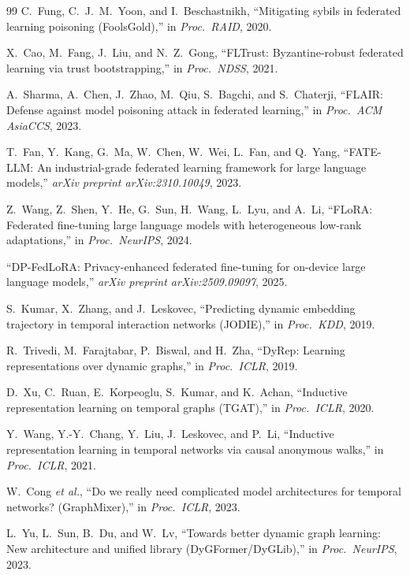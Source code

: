 \documentclass[12pt,a4paper]{article}
\theoremstyle{definition}
\theoremstyle{remark}
\begin{document}
\begin{thebibliography}{99}
C.~Fung, C.~J.~M.~Yoon, and I.~Beschastnikh, ``Mitigating sybils in federated learning poisoning ({FoolsGold}),'' in \emph{Proc.\ RAID}, 2020.

X.~Cao, M.~Fang, J.~Liu, and N.~Z.~Gong, ``{FLTrust}: {Byzantine}-robust federated learning via trust bootstrapping,'' in \emph{Proc.\ NDSS}, 2021.

A.~Sharma, A.~Chen, J.~Zhao, M.~Qiu, S.~Bagchi, and S.~Chaterji, ``{FLAIR}: Defense against model poisoning attack in federated learning,'' in \emph{Proc.\ ACM AsiaCCS}, 2023.

T.~Fan, Y.~Kang, G.~Ma, W.~Chen, W.~Wei, L.~Fan, and Q.~Yang, ``{FATE-LLM}: An industrial-grade federated learning framework for large language models,'' \emph{arXiv preprint arXiv:2310.10049}, 2023.

Z.~Wang, Z.~Shen, Y.~He, G.~Sun, H.~Wang, L.~Lyu, and A.~Li, ``{FLoRA}: Federated fine-tuning large language models with heterogeneous low-rank adaptations,'' in \emph{Proc.\ NeurIPS}, 2024.

``{DP-FedLoRA}: Privacy-enhanced federated fine-tuning for on-device large language models,'' \emph{arXiv preprint arXiv:2509.09097}, 2025.

S.~Kumar, X.~Zhang, and J.~Leskovec, ``Predicting dynamic embedding trajectory in temporal interaction networks ({JODIE}),'' in \emph{Proc.\ KDD}, 2019.

R.~Trivedi, M.~Farajtabar, P.~Biswal, and H.~Zha, ``{DyRep}: Learning representations over dynamic graphs,'' in \emph{Proc.\ ICLR}, 2019.

D.~Xu, C.~Ruan, E.~Korpeoglu, S.~Kumar, and K.~Achan, ``Inductive representation learning on temporal graphs ({TGAT}),'' in \emph{Proc.\ ICLR}, 2020.

Y.~Wang, Y.-Y.~Chang, Y.~Liu, J.~Leskovec, and P.~Li, ``Inductive representation learning in temporal networks via causal anonymous walks,'' in \emph{Proc.\ ICLR}, 2021.

W.~Cong \emph{et al.}, ``Do we really need complicated model architectures for temporal networks? ({GraphMixer}),'' in \emph{Proc.\ ICLR}, 2023.

L.~Yu, L.~Sun, B.~Du, and W.~Lv, ``Towards better dynamic graph learning: New architecture and unified library ({DyGFormer}/{DyGLib}),'' in \emph{Proc.\ NeurIPS}, 2023.


\end{thebibliography}
\end{document}
